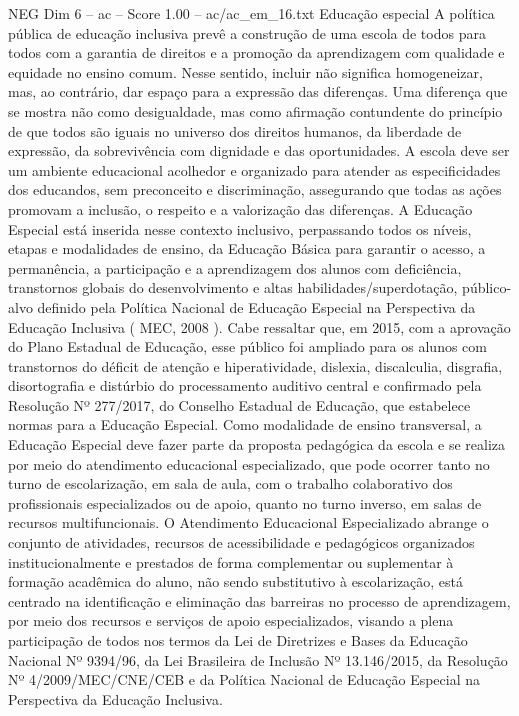 \begin{textsample}{NEG Dim 6 – ac – Score 1.00 – ac/ac\_em\_16.txt}
Educação especial A política pública de educação inclusiva prevê a construção de uma escola de todos para todos com a garantia de direitos e a promoção da aprendizagem com qualidade e equidade no ensino comum.
Nesse sentido, incluir não significa homogeneizar, mas, ao contrário, dar espaço para a expressão das diferenças.
Uma diferença que se mostra não como desigualdade, mas como afirmação contundente do princípio de que todos são iguais no universo dos direitos humanos, da liberdade de expressão, da sobrevivência com dignidade e das oportunidades.
A escola deve ser um ambiente educacional acolhedor e organizado para atender as especificidades dos educandos, sem preconceito e discriminação, assegurando que todas as ações promovam a inclusão, o respeito e a valorização das diferenças.
A Educação Especial está inserida nesse contexto inclusivo, perpassando todos os níveis, etapas e modalidades de ensino, da Educação Básica para garantir o acesso, a permanência, a participação e a aprendizagem dos alunos com deficiência, transtornos globais do desenvolvimento e altas habilidades/superdotação, público-alvo definido pela Política Nacional de Educação Especial na Perspectiva da Educação Inclusiva ( MEC, 2008 ).
Cabe ressaltar que, em 2015, com a aprovação do Plano Estadual de Educação, esse público foi ampliado para os alunos com transtornos do déficit de atenção e hiperatividade, dislexia, discalculia, disgrafia, disortografia e distúrbio do processamento auditivo central e confirmado pela Resolução Nº 277/2017, do Conselho Estadual de Educação, que estabelece normas para a Educação Especial.
Como modalidade de ensino transversal, a Educação Especial deve fazer parte da proposta pedagógica da escola e se realiza por meio do atendimento educacional especializado, que pode ocorrer tanto no turno de escolarização, em sala de aula, com o trabalho colaborativo dos profissionais especializados ou de apoio, quanto no turno inverso, em salas de recursos multifuncionais.
O Atendimento Educacional Especializado abrange o conjunto de atividades, recursos de acessibilidade e pedagógicos organizados institucionalmente e prestados de forma complementar ou suplementar à formação acadêmica do aluno, não sendo substitutivo à escolarização, está centrado na identificação e eliminação das barreiras no processo de aprendizagem, por meio dos recursos e serviços de apoio especializados, visando a plena participação de todos nos termos da Lei de Diretrizes e Bases da Educação Nacional Nº 9394/96, da Lei Brasileira de Inclusão Nº 13.146/2015, da Resolução Nº 4/2009/MEC/CNE/CEB e da Política Nacional de Educação Especial na Perspectiva da Educação Inclusiva.

\end{textsample}
